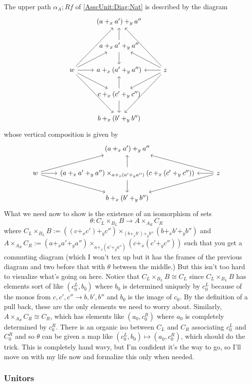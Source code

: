 \documentclass[12pt]{article}
\newcommand{\from}{\colon}
\renewcommand{\(}{\left(}
\renewcommand{\)}{\right)}
\renewcommand{\{}{\left\lbrace}
\renewcommand{\}}{\right\rbrace}
\theoremstyle{remark}
\theoremstyle{definition}
\begin{document}
The upper path $\alpha_A ; Rf$ of \eqref{AsscUnit:Diag:Nat} is described by the diagram
\[
\begin{tikzcd}
	{} &
	{(a +_x a') +_y a''} &
	{} \\
	{} &
	{a +_x a' +_y a''} 
		\ar[u]
		\ar[d] &
	{} \\
	{w} 
		\ar[ruu] 
		\ar[ru]
		\ar[r]
		\ar[rd]
		\ar[rdd] &
	{a +_x (a' +_y a'')} &
	{z} 
		\ar[luu] 
		\ar[lu]
		\ar[l]
		\ar[ld]
		\ar[ldd] &\\
	{} &
	{c +_x (c' +_y c'')} 
		\ar[u]
		\ar[d] &
	{} \\
	{} &
	{b +_x (b' +_y b'')} &
	{} 
	\end{tikzcd}
\]
whose vertical composition is given by
\[
	\begin{tikzcd}
		{} &
		{(a +_x a') +_y a''} &
		{} \\
		{w} 
			\ar[ru] 
			\ar[r]
			\ar[rd] &
		{(a+_xa'+_ya'') \times_{a+_x(a'+_ya'')}(c+_x(c'+_yc'')) } 
			\ar[u]
			\ar[d]&
		{z} 
			\ar[lu] 
			\ar[l]
			\ar[ld] \\
		{} &
		{b +_x (b' +_y b'')} &
		{} 
	\end{tikzcd}
\]
What we need now to show is the existence of an isomorphism of sets 
\[
	\theta \from C_L \times_{B_L} B \to A \times_{A_R} C_R
\] 
where $C_L \times_{B_L} B :=((c+_xc')+_yc'') \times_{(b+_xb')+_yb''}(b+_xb'+_yb'')$ and $A \times_{A_R} C_R := (a+_xa'+_ya'')\times_{a+_x(a'+_ya'')}(c+_x(c'+_yc''))$
such that you get a commuting diagram (which I won't tex up but it has the frames of the previous diagram and two before that with $\theta$ between the middle.) But this isn't too hard to visualize what's going on here.  Notice that $C_L \times_{B_L} B \cong C_L$ since $C_L \times_{B_L} B$ has elements sort of like $(c^L_0,b_0)$ where $b_0$ is determined uniquely by $c^L_0$ because of the monos from $c,c',c'' \to b,b',b''$ and $b_0$ is the image of $c_0$.  By the definition of a pull back, these are the only elements we need to worry about.  Similarly, $A \times_{A_R} C_R \cong C_R$, which has elements like $(a_0,c^R_0)$ where $a_0$ is completely determined by $c^R_0$. There is an organic iso between $C_L$ and $C_R$ associating $c^L_0$ and $C^R_0$ and so $\theta$ can be given a map like $(c^L_0,b_0) \mapsto (a_0,c^R_0)$, which should do the trick.  This is completely hand wavy, but I'm confident it's the way to go, so I'll move on with my life now and formalize this only when needed.  

\subsubsection*{Unitors}
\end{document}
